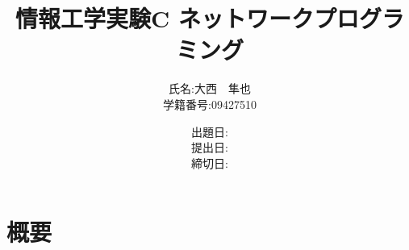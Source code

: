 \documentclass[a4j]{jarticle}
\title{情報工学実験C ネットワークプログラミング}
\author{氏名:大西　隼也 \\学籍番号:09427510}
\date{出題日: \\提出日: \\締切日:}
\begin{document}
\maketitle

\section{概要}
\end{document}
